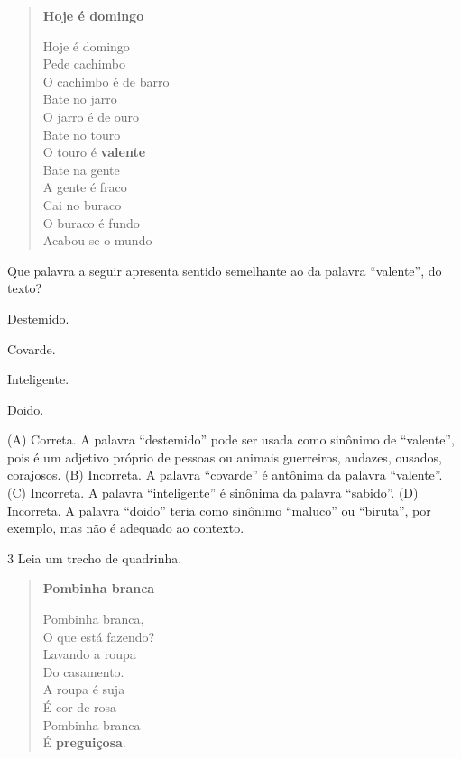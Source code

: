 \begin{verse}
\textbf{Hoje é domingo}

Hoje é domingo\\
Pede cachimbo\\
O cachimbo é de barro\\
Bate no jarro\\
O jarro é de ouro\\
Bate no touro\\
O touro é \textbf{valente}\\
Bate na gente\\
A gente é fraco\\
Cai no buraco\\
O buraco é fundo\\
Acabou-se o mundo

\end{verse}

Que palavra a seguir apresenta sentido semelhante ao da palavra
``valente'', do texto?

\begin{escolha}
\item Destemido.

\item Covarde.

\item Inteligente.

\item Doido.
\end{escolha}


(A) Correta. A palavra ``destemido'' pode ser usada como sinônimo de
``valente'', pois é um adjetivo próprio de pessoas ou animais
guerreiros, audazes, ousados, corajosos.
(B) Incorreta. A palavra ``covarde'' é antônima da palavra ``valente''.
(C) Incorreta. A palavra ``inteligente'' é sinônima da palavra
``sabido''.
(D) Incorreta. A palavra ``doido'' teria como sinônimo ``maluco'' ou
``biruta'', por exemplo, mas não é adequado ao contexto.

\num{3} Leia um trecho de quadrinha.

\begin{verse}
\textbf{Pombinha branca}

Pombinha branca,\\
O que está fazendo?\\
Lavando a roupa\\
Do casamento.\\
A roupa é suja\\
É cor de rosa\\
Pombinha branca\\
É \textbf{preguiçosa}.

\end{verse}

